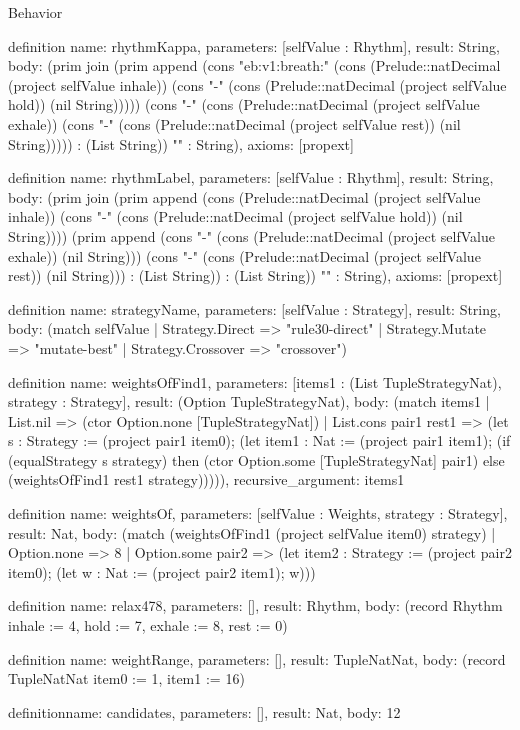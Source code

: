\begin{lexlean}{Behavior}
\begin{semanticmodule}
definition{
  name: rhythmKappa,
  parameters: [selfValue : Rhythm],
  result: String,
  body: (prim join (prim append (cons "eb:v1:breath:" (cons (Prelude::natDecimal (project selfValue inhale)) (cons "-" (cons (Prelude::natDecimal (project selfValue hold)) (nil String))))) (cons "-" (cons (Prelude::natDecimal (project selfValue exhale)) (cons "-" (cons (Prelude::natDecimal (project selfValue rest)) (nil String))))) : (List String)) "" : String),
  axioms: [propext]
}

definition{
  name: rhythmLabel,
  parameters: [selfValue : Rhythm],
  result: String,
  body: (prim join (prim append (cons (Prelude::natDecimal (project selfValue inhale)) (cons "-" (cons (Prelude::natDecimal (project selfValue hold)) (nil String)))) (prim append (cons "-" (cons (Prelude::natDecimal (project selfValue exhale)) (nil String))) (cons "-" (cons (Prelude::natDecimal (project selfValue rest)) (nil String))) : (List String)) : (List String)) "" : String),
  axioms: [propext]
}

definition{
  name: strategyName,
  parameters: [selfValue : Strategy],
  result: String,
  body: (match selfValue
    | Strategy.Direct => "rule30-direct"
    | Strategy.Mutate => "mutate-best"
    | Strategy.Crossover => "crossover")
}

definition{
  name: weightsOfFind1,
  parameters: [items1 : (List TupleStrategyNat), strategy : Strategy],
  result: (Option TupleStrategyNat),
  body: (match items1
    | List.nil => (ctor Option.none [TupleStrategyNat])
    | List.cons pair1 rest1 => (let s : Strategy := (project pair1 item0); (let item1 : Nat := (project pair1 item1); (if (equalStrategy s strategy) then (ctor Option.some [TupleStrategyNat] pair1) else (weightsOfFind1 rest1 strategy))))),
  recursive_argument: items1
}

definition{
  name: weightsOf,
  parameters: [selfValue : Weights, strategy : Strategy],
  result: Nat,
  body: (match (weightsOfFind1 (project selfValue item0) strategy)
    | Option.none => 8
    | Option.some pair2 => (let item2 : Strategy := (project pair2 item0); (let w : Nat := (project pair2 item1); w)))
}

definition{
  name: relax478,
  parameters: [],
  result: Rhythm,
  body: (record Rhythm {inhale := 4, hold := 7, exhale := 8, rest := 0})
}

definition{
  name: weightRange,
  parameters: [],
  result: TupleNatNat,
  body: (record TupleNatNat {item0 := 1, item1 := 16})
}

definition{name: candidates, parameters: [], result: Nat, body: 12}


\end{semanticmodule}
\end{lexlean}
